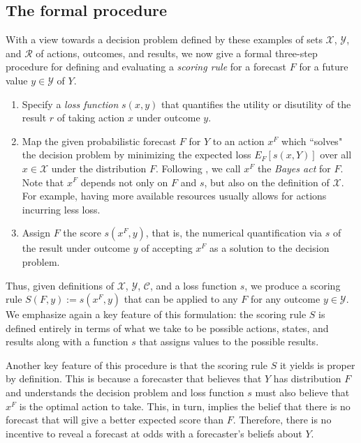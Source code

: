 \documentclass{article}
\begin{document}
\subsection{The formal procedure}

With a view towards a decision problem defined by these examples of sets $\mathcal{X}$, $\mathcal{Y}$, and $\mathcal{R}$ of actions, outcomes, and results, we now give a formal three-step procedure for defining and evaluating a \emph{scoring rule} for a forecast $F$ for a future value $y \in \mathcal{Y}$ of $Y$.

\begin{enumerate}
\item Specify a \emph{loss function} $s(x,y)$ that quantifies the utility or disutility of the result $r$ of taking action $x$ under outcome $y$.
\item Map the given probabilistic forecast $F$ for $Y$ to an action $x^F$ which ``solves" the decision problem by minimizing the expected loss $E_F\left[s(x,Y)\right]$ over all $x \in \mathcal{X}$ under the distribution $F$.  Following \cite{dawid2007geometry}, we call $x^F$ the \emph{Bayes act} for $F$. Note that $x^F$ depends not only on $F$ and $s$, but also on the definition of $\mathcal{X}$. For example, having more available resources usually allows for actions incurring less loss.   
\item Assign $F$ the score $s(x^F,y)$, that is, the numerical quantification via $s$ of the result under outcome $y$ of accepting $x^F$ as a solution to the decision problem.
\end{enumerate}{}

Thus, given definitions of $\mathcal{X}$, $\mathcal{Y}$, $\mathcal{C}$, and a loss function $s$, we produce a scoring rule $S(F,y):= s(x^F,y)$ that can be applied to any $F$ for any outcome $y \in \mathcal{Y}$.  We emphasize again a key feature of this formulation: the scoring rule $S$ is defined entirely in terms of what we take to be possible actions, states, and results along with a function $s$ that assigns values to the possible results.

Another key feature of this procedure is that the scoring rule $S$ it yields is proper by definition.  This is because a forecaster that believes that $Y$ has distribution $F$ and understands the decision problem and loss function $s$ must also believe that $x^F$ is the optimal action to take.  This, in turn, implies the belief that there is no forecast that will give a better expected score than $F$.  Therefore, there is no incentive to reveal a forecast at odds with a forecaster's beliefs about $Y$.  
\end{document}
